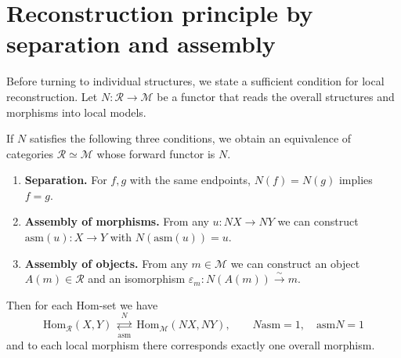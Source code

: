 \section{Reconstruction principle by separation and assembly}\label{sec:8.3}

Before turning to individual structures, we state a sufficient condition for local
reconstruction.
Let $N:\mathcal{R}\to\mathcal{M}$ be a functor that reads the overall structures and
morphisms into local models.

\begin{theorem}\label{thm:8.12}

If $N$ satisfies the following three conditions, we obtain an equivalence of categories
$\mathcal{R}\simeq\mathcal{M}$ whose forward functor is $N$.

\begin{enumerate}
\item \textbf{Separation.} For $f,g$ with the same endpoints, $N(f)=N(g)$ implies $f=g$.
\item \textbf{Assembly of morphisms.} From any $u:NX\to NY$ we can construct
$\mathrm{asm}(u):X\to Y$ with $N(\mathrm{asm}(u))=u$.
\item \textbf{Assembly of objects.} From any $m\in\mathcal{M}$ we can construct an object
$A(m)\in\mathcal{R}$ and an isomorphism
$\varepsilon_m:N(A(m))\xrightarrow{\sim}m$.
\end{enumerate}

Then for each Hom-set we have
\begin{equation*}
\mathrm{Hom}_{\mathcal{R}}(X,Y)
\ \underset{\mathrm{asm}}{\overset{N}{\rightleftarrows}}\
\mathrm{Hom}_{\mathcal{M}}(NX,NY),\qquad
N\mathrm{asm}=1,\quad
\mathrm{asm}N=1
\tag{8.11}\label{eq:8.11}
\end{equation*}
and to each local morphism there corresponds exactly one overall morphism.

\end{theorem}

